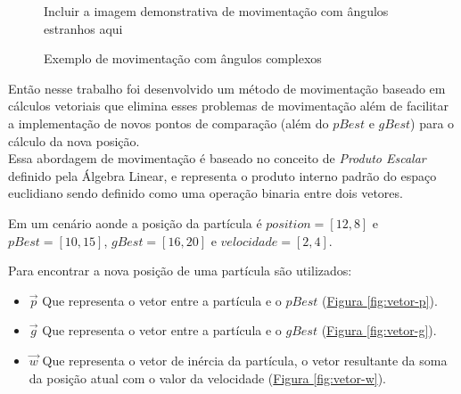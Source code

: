             \begin{figure}[ht]
                \centering
                \small{Incluir a imagem demonstrativa de movimentação com ângulos estranhos aqui}
                \caption{Exemplo de movimentação com ângulos complexos}
                \label{fig:angular-moviment-grid-based}
            \end{figure}
            
            
            Então nesse trabalho foi desenvolvido um método de movimentação baseado em cálculos vetoriais que elimina esses problemas de movimentação além de facilitar a implementação de novos pontos de comparação (além do $pBest$ e $gBest$) para o cálculo da nova posição.\\
            
                Essa abordagem de movimentação é baseado no conceito de \textit{Produto Escalar} definido pela Álgebra Linear, e representa o produto interno padrão do espaço euclidiano sendo definido como uma operação binaria entre dois vetores.\hfill\vspace{\onelineskip}
                
                \noindent Em um cenário aonde a posição da partícula é $position=[12,8]$ e $pBest=[10, 15]$, $gBest=[16,20]$ e $velocidade=[2,4]$.

                \noindent Para encontrar a nova posição de uma partícula são utilizados:
                \begin{itemize}
                    \item $\vec p$ Que representa o vetor entre a partícula e o $pBest$ 
                        (\hyperref[fig:vetor-p]{Figura \ref{fig:vetor-p}}).
                    \item $\vec g$ Que representa o vetor entre a partícula e o $gBest$ 
                        (\hyperref[fig:vetor-g]{Figura \ref{fig:vetor-g}}).
                    \item $\vec w$ Que representa o vetor de inércia da partícula, o vetor resultante da soma da posição atual com o valor da velocidade 
                        (\hyperref[fig:vetor-w]{Figura \ref{fig:vetor-w}}).
                \end{itemize}

